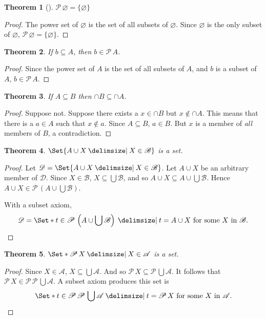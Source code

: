 \documentclass[12pt]{article}
\theoremstyle{plain}
\newtheorem{thm}{Theorem}[section]
\theoremstyle{remark}
\theoremstyle{definition}
\theoremstyle{remark}
\newcommand{\powerset}{\mathscr{P}\,}
\newcommand{\thmproof}[3]{%
\begin{thm}[#1]
#2
\end{thm}
\begin{proof}
#3
\end{proof}
}
\providecommand\st{}
\newcommand\SetSymbol[1][]{%
\nonscript\:#1\vert%
\allowbreak%
\nonscript\:
\mathopen{}}
\renewcommand\st{\SetSymbol[\delimsize]}
\begin{document}
\thmproof{}{$\powerset \varnothing = \{\varnothing\}$}
{The power set of $\varnothing$ is the set of all subsets of $\varnothing$. Since $\varnothing$ is the only subset of $\varnothing$, $\powerset \varnothing = \{\varnothing \}$.
}

\begin{thm}\label{powersetMember}
If $b \subseteq A$, then $b \in \powerset A$.
\end{thm}
\begin{proof}
Since the power set of $A$ is the set of all subsets of $A$, and $b$ is a subset of $A$, $b \in \powerset A$.
\end{proof}

\begin{thm}
If $A \subseteq B$ then $\cap B \subseteq \cap A$.
\end{thm}
\begin{proof}
Suppose not. Suppose there exists a $x \in \cap B$ but $x \not\in \cap A$. This means that there is a $a \in A$ such that $x \not\in a$. Since $A \subseteq B$, $a \in B$. But $x$ is a member of \textit{all} members of $B$, a contradiction.
\end{proof}

\begin{thm}
$\Set{A \cup X \st X \in \mathscr{B}}$ is a set.
\end{thm}
\begin{proof}
Let $\mathscr{D} = \Set{A \cup X \st X \in \mathscr{B}}$. Let $A \cup X$ be an arbitrary member of $\mathscr{D}$. Since $X \in \mathscr{B}$, $X \subseteq \bigcup \mathscr{B}$, and so $A \cup X \subseteq A \cup \bigcup \mathscr{B}$. Hence $A \cup X \in \powerset\left(A \cup \bigcup  \mathscr{B}\right)$.

With a subset axiom,
\[
\mathscr{D} = \Set*{t \in \powerset\left(A \cup \bigcup  \mathscr{B}\right) \st t = A \cup X \ \text{for some $X$ in $\mathscr{B}$}}.
\]
\end{proof}

\begin{thm}
$\Set*{\powerset X \st X \in \mathscr{A}}$ is a set.
\end{thm}
\begin{proof}
Since $X \in \mathscr{A}$, $X \subseteq \bigcup  \mathscr{A}$. And so $\powerset X \subseteq \powerset \bigcup  \mathscr{A}$. It follows that $\powerset X \in \powerset \powerset \bigcup  \mathscr{A}$. A subset axiom produces this set is
\[
\Set*{t \in \powerset \powerset \bigcup  \mathscr{A} \st t = \powerset X\ \text{for some $X$ in $\mathscr{A}$}}.
\]
\end{proof}
\end{document}

